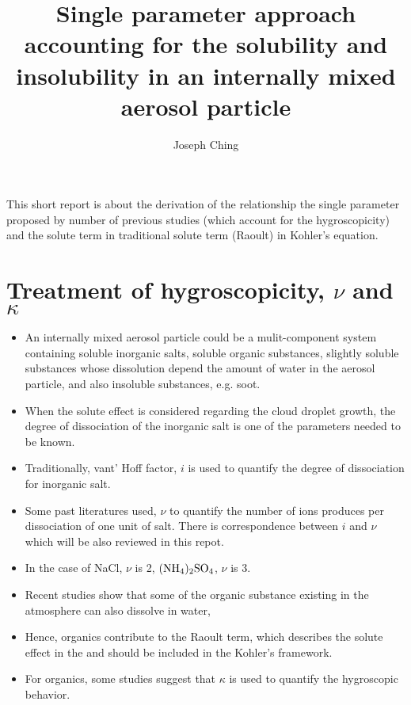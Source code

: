 \documentclass[12pt]{article}
\title{Single parameter approach accounting for the solubility and insolubility in an internally mixed aerosol particle}
\author{Joseph Ching}
\begin{document}
\maketitle
\tableofcontents

This short report is about the derivation of the relationship the single parameter proposed by number of previous studies (which account for the hygroscopicity) and the solute term in traditional solute term (Raoult) in Kohler's equation.


\section{Treatment of hygroscopicity, $\nu$ and $\kappa$}  
 
\begin{itemize}

\item An internally mixed aerosol particle could be a mulit-component system containing soluble inorganic salts, soluble organic substances, slightly soluble substances whose dissolution depend the amount of water in the aerosol particle, and also insoluble substances, e.g. soot.

\item When the solute effect is considered regarding the cloud droplet growth, the degree of dissociation of the inorganic salt is one of the parameters needed to be known. 

\item Traditionally, vant' Hoff factor, $i$ is used to quantify the degree of dissociation for inorganic salt. 

\item Some past literatures used, $\nu$ to quantify the number of ions produces per dissociation of one unit of salt. There is correspondence between $i$ and $\nu$ which will be also reviewed in this repot.

\item  In the case of NaCl, $\nu$ is 2, $\rm (NH_4)_2SO_4$, $\nu$ is 3.

\item Recent studies show that some of the organic substance existing in the atmosphere can also dissolve in water,

\item Hence, organics contribute to the Raoult term, which describes the solute effect in the and should be included in the Kohler's  framework. 

\item For organics, some studies suggest that $\kappa$ is used to quantify the hygroscopic behavior. 



\end{itemize}
\end{document}

